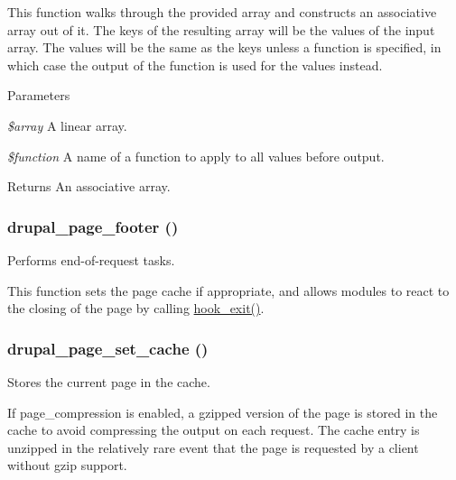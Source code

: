 This function walks through the provided array and constructs an associative array out of it. The keys of the resulting array will be the values of the input array. The values will be the same as the keys unless a function is specified, in which case the output of the function is used for the values instead.


\begin{DoxyParams}{Parameters}
\item[{\em \$array}]A linear array. \item[{\em \$function}]A name of a function to apply to all values before output.\end{DoxyParams}
\begin{DoxyReturn}{Returns}
An associative array. 
\end{DoxyReturn}
\hypertarget{common_8inc_a64bc7d539a74e850935d73968788abd3}{
\subsubsection[{drupal\_\-page\_\-footer}]{\setlength{\rightskip}{0pt plus 5cm}drupal\_\-page\_\-footer ()}}
\label{common_8inc_a64bc7d539a74e850935d73968788abd3}
Performs end-\/of-\/request tasks.

This function sets the page cache if appropriate, and allows modules to react to the closing of the page by calling \hyperlink{group__hooks_gaab945bbc2e651510aee460dcc8691366}{hook\_\-exit()}. \hypertarget{common_8inc_ac46363381db03a8d6a2663d031d8ce07}{
\subsubsection[{drupal\_\-page\_\-set\_\-cache}]{\setlength{\rightskip}{0pt plus 5cm}drupal\_\-page\_\-set\_\-cache ()}}
\label{common_8inc_ac46363381db03a8d6a2663d031d8ce07}
Stores the current page in the cache.

If page\_\-compression is enabled, a gzipped version of the page is stored in the cache to avoid compressing the output on each request. The cache entry is unzipped in the relatively rare event that the page is requested by a client without gzip support.


